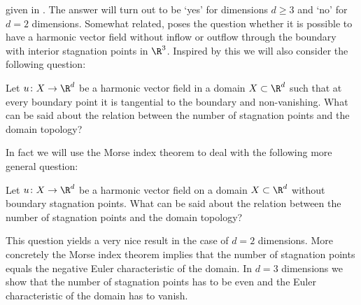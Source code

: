 given in \cite{Alber1992}.
The answer will turn out to be `yes' for dimensions $d\geq3$ and `no' for $d=2$ dimensions.
Somewhat related, \cite[p.198]{Lortz1970} poses the question whether it is possible to have a harmonic vector field
without inflow or outflow through the boundary with interior stagnation points in $\R^3$.
Inspired by this we will also consider the following question:
\begin{question}
  Let $u\colon X\to\R^d$ be a harmonic vector field in a domain $X\subset\R^d$ such that at every boundary point it is tangential to the boundary
  and non-vanishing.
  What can be said about the relation between the number of stagnation points and the domain topology?
\end{question}
In fact we will use the Morse index theorem to deal with the following more general question:
\begin{question}
  \label{qu:noInflowNoOutflow}
  Let $u\colon X\to\R^d$ be a harmonic vector field on a domain $X\subset\R^d$ without boundary stagnation points.
  What can be said about the relation between the number of stagnation points and the domain topology?
\end{question}
This question yields a very nice result in the case of $d=2$ dimensions.
More concretely the Morse index theorem implies that the number of stagnation points equals the negative Euler characteristic of the domain.
In $d=3$ dimensions we show that the number of stagnation points has to be even and the Euler characteristic of the
domain has to vanish.

